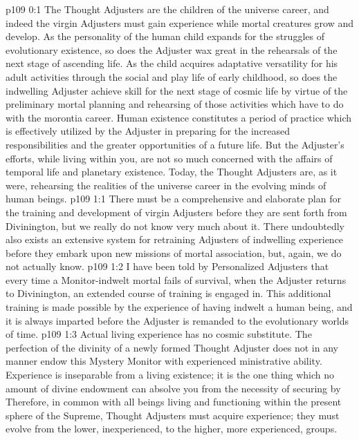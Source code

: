 \author{Solitary Messenger}
\vs p109 0:1 The Thought Adjusters are the children of the universe career, and indeed the virgin Adjusters must gain experience while mortal creatures grow and develop. As the personality of the human child expands for the struggles of evolutionary existence, so does the Adjuster wax great in the rehearsals of the next stage of ascending life. As the child acquires adaptative versatility for his adult activities through the social and play life of early childhood, so does the indwelling Adjuster achieve skill for the next stage of cosmic life by virtue of the preliminary mortal planning and rehearsing of those activities which have to do with the morontia career. Human existence constitutes a period of practice which is effectively utilized by the Adjuster in preparing for the increased responsibilities and the greater opportunities of a future life. But the Adjuster’s efforts, while living within you, are not so much concerned with the affairs of temporal life and planetary existence. Today, the Thought Adjusters are, as it were, rehearsing the realities of the universe career in the evolving minds of human beings.
\vs p109 1:1 There must be a comprehensive and elaborate plan for the training and development of virgin Adjusters before they are sent forth from Divinington, but we really do not know very much about it. There undoubtedly also exists an extensive system for retraining Adjusters of indwelling experience before they embark upon new missions of mortal association, but, again, we do not actually know.
\vs p109 1:2 I have been told by Personalized Adjusters that every time a Monitor\hyp{}indwelt mortal fails of survival, when the Adjuster returns to Divinington, an extended course of training is engaged in. This additional training is made possible by the experience of having indwelt a human being, and it is always imparted before the Adjuster is remanded to the evolutionary worlds of time.
\vs p109 1:3 Actual living experience has no cosmic substitute. The perfection of the divinity of a newly formed Thought Adjuster does not in any manner endow this Mystery Monitor with experienced ministrative ability. Experience is inseparable from a living existence; it is the one thing which no amount of divine endowment can absolve you from the necessity of securing by  Therefore, in common with all beings living and functioning within the present sphere of the Supreme, Thought Adjusters must acquire experience; they must evolve from the lower, inexperienced, to the higher, more experienced, groups.
